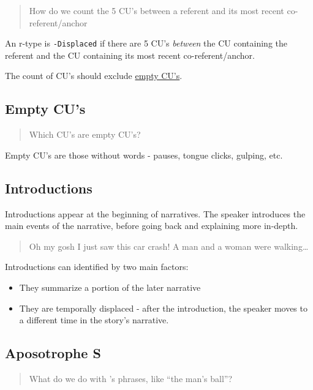 \documentclass[
]{book}
\providecommand{\tightlist}{%
  \setlength{\itemsep}{0pt}\setlength{\parskip}{0pt}}
\begin{document}
\begin{quote}
How do we count the 5 CU's between a referent and its most recent co-referent/anchor
\end{quote}

An r-type is \texttt{-Displaced} if there are 5 CU's \emph{between} the CU containing the referent and the CU containing its most recent co-referent/anchor.

The count of CU's should exclude \href{empty-cu's}{empty CU's}.

\hypertarget{empty-cus}{%
\subsection{Empty CU's}\label{empty-cus}}

\begin{quote}
Which CU's are empty CU's?
\end{quote}

Empty CU's are those without words - pauses, tongue clicks, gulping, etc.

\hypertarget{introductions}{%
\subsection{Introductions}\label{introductions}}

Introductions appear at the beginning of narratives.
The speaker introduces the main events of the narrative,
before going back and explaining more in-depth.

\begin{quote}
Oh my gosh I just saw this car crash!
A man and a woman were walking\ldots{}
\end{quote}

Introductions can identified by two main factors:

\begin{itemize}
\tightlist
\item
  They summarize a portion of the later narrative
\item
  They are temporally displaced - after the introduction,
  the speaker moves to a different time in the story's narrative.
\end{itemize}

\hypertarget{aposotrophe-s}{%
\subsection{Aposotrophe S}\label{aposotrophe-s}}

\begin{quote}
What do we do with 's phrases, like ``the man's ball''?
\end{quote}
\end{document}
